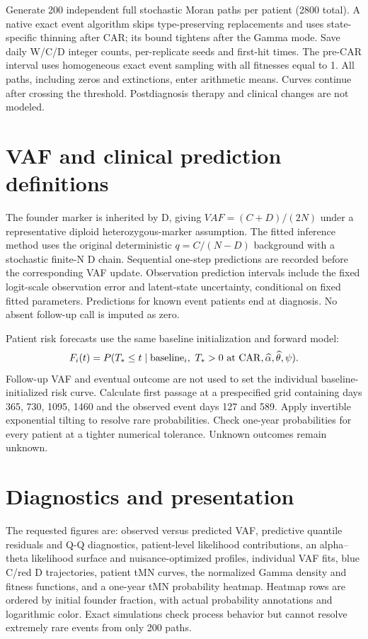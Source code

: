 \documentclass[11pt]{article}
\begin{document}
Generate 200 independent full stochastic Moran paths per patient (2800 total). A native exact event algorithm skips type-preserving replacements and uses state-specific thinning after CAR; its bound tightens after the Gamma mode. Save daily W/C/D integer counts, per-replicate seeds and first-hit times. The pre-CAR interval uses homogeneous exact event sampling with all fitnesses equal to 1.
All paths, including zeros and extinctions, enter arithmetic means. Curves continue after crossing the threshold. Postdiagnosis therapy and clinical changes are not modeled.

\section{VAF and clinical prediction definitions}
The founder marker is inherited by D, giving $VAF=(C+D)/(2N)$ under a representative diploid heterozygous-marker assumption.
The fitted inference method uses the original deterministic $q=C/(N-D)$ background with a stochastic finite-N D chain. Sequential one-step predictions are recorded before the corresponding VAF update. Observation prediction intervals include the fixed logit-scale observation error and latent-state uncertainty, conditional on fixed fitted parameters.
Predictions for known event patients end at diagnosis. No absent follow-up call is imputed as zero.

Patient risk forecasts use the same baseline initialization and forward model:
\[
F_i(t)=P(T_*\le t\mid {\rm baseline}_i,\ T_*>0\ {\rm at\ CAR},\widehat\alpha,\widehat\theta,\psi).
\]
Follow-up VAF and eventual outcome are not used to set the individual baseline-initialized risk curve.
Calculate first passage at a prespecified grid containing days 365, 730, 1095, 1460 and the observed event days 127 and 589. Apply invertible exponential tilting to resolve rare probabilities. Check one-year probabilities for every patient at a tighter numerical tolerance. Unknown outcomes remain unknown.

\section{Diagnostics and presentation}
The requested figures are: observed versus predicted VAF, predictive quantile residuals and Q-Q diagnostics, patient-level likelihood contributions, an alpha--theta likelihood surface and nuisance-optimized profiles, individual VAF fits, blue C/red D trajectories, patient tMN curves, the normalized Gamma density and fitness functions, and a one-year tMN probability heatmap.
Heatmap rows are ordered by initial founder fraction, with actual probability annotations and logarithmic color. Exact simulations check process behavior but cannot resolve extremely rare events from only 200 paths.
\end{document}
